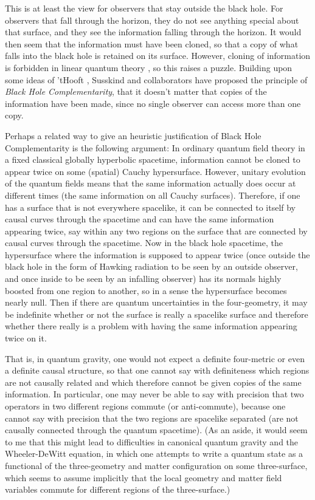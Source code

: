 \documentclass[12pt]{article} \usepackage{latexsym} \textwidth 15cm
\begin{document}
This is at least the view for observers that stay outside the black
hole.  For observers that fall through the horizon, they do not see
anything special about that surface, and they see the information
falling through the horizon.  It would then seem that the information
must have been cloned, so that a copy of what falls into the black
hole is retained on its surface.  However, cloning of information is
forbidden in linear quantum theory \cite{clone}, so this raises a
puzzle.  Building upon some ideas of 'tHooft
\cite{tHooft,'tHooft2,'tHooft3}, Susskind and collaborators
\cite{STU,Suss,ST,Suss2,LSU,LPSTU,SU} have proposed the principle of
{\it Black Hole Complementarity}, that it doesn't matter that copies
of the information have been made, since no single observer can access
more than one copy.

Perhaps a related way to give an heuristic justification of Black Hole
Complementarity is the following argument:  In ordinary quantum field
theory in a fixed classical globally hyperbolic spacetime, information
cannot be cloned to appear twice on some (spatial) Cauchy
hypersurface.  However, unitary evolution of the quantum fields means
that the same information actually does occur at different times (the
same information on all Cauchy surfaces).  Therefore, if one has a
surface that is not everywhere spacelike, it can be connected to
itself by causal curves through the spacetime and can have the same
information appearing twice, say within any two regions on the surface
that are connected by causal curves through the spacetime.  Now in the
black hole spacetime, the hypersurface where the information is
supposed to appear twice (once outside the black hole in the form of
Hawking radiation to be seen by an outside observer, and once inside
to be seen by an infalling observer) has its normals highly boosted
from one region to another, so in a sense the hypersurface becomes
nearly null.  Then if there are quantum uncertainties in the
four-geometry, it may be indefinite whether or not the surface is
really a spacelike surface and therefore whether there really is a
problem with having the same information appearing twice on it.

That is, in quantum gravity, one would not expect a definite
four-metric or even a definite causal structure, so that one cannot
say with definiteness which regions are not causally related and which
therefore cannot be given copies of the same information.  In
particular, one may never be able to say with precision that two
operators in two different regions commute (or anti-commute), because
one cannot say with precision that the two regions are spacelike
separated (are not causally connected through the quantum spacetime).
(As an aside, it would seem to me that this might lead to difficulties
in canonical quantum gravity and the Wheeler-DeWitt equation, in which
one attempts to write a quantum state as a functional of the
three-geometry and matter configuration on some three-surface, which
seems to assume implicitly that the local geometry and matter field
variables commute for different regions of the three-surface.)
\end{document}
